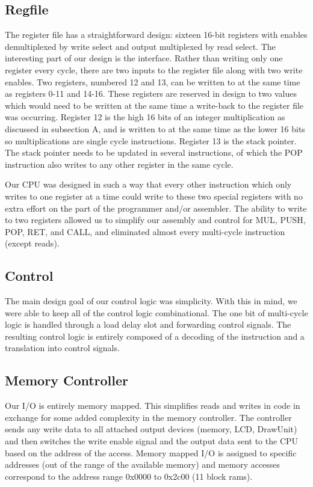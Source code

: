 \documentclass[onecolumn]{IEEEtran}
\begin{document}
\subsection{Regfile}
The register file has a straightforward design: sixteen 16-bit registers with enables demultiplexed by write select and output multiplexed by read select.  The interesting part of our design is the interface.  Rather than writing only one register every cycle, there are two inputs to the register file along with two write enables.  Two registers, numbered 12 and 13, can be written to at the same time as registers 0-11 and 14-16.  These registers are reserved in design to two values which would need to be written at the same time a write-back to the register file was occurring.  Register 12 is the high 16 bits of an integer multiplication as discussed in subsection A, and is written to at the same time as the lower 16 bits so multiplications are single cycle instructions.  Register 13 is the stack pointer.  The stack pointer needs to be updated in several instructions, of which the POP instruction also writes to any other register in the same cycle.

Our CPU was designed in such a way that every other instruction which only writes to one register at a time could write to these two special registers with no extra effort on the part of the programmer and/or assembler. The ability to write to two registers allowed us to simplify our assembly and control for MUL, PUSH, POP, RET, and CALL, and eliminated almost every multi-cycle instruction (except reads).

\subsection{Control}
The main design goal of our control logic was simplicity.  With this in mind, we were able to keep all of the control logic combinational.  The one bit of multi-cycle logic is handled through a load delay slot and forwarding control signals.  The resulting control logic is entirely composed of a decoding of the instruction and a translation into control signals.

\subsection{Memory Controller}
Our I/O is entirely memory mapped.  This simplifies reads and writes in code in exchange for some added complexity in the memory controller.  The controller sends any write data to all attached output devices (memory, LCD, DrawUnit) and then switches the write enable signal and the output data sent to the CPU based on the address of the access.  Memory mapped I/O is assigned to specific addresses (out of the range of the available memory) and memory accesses correspond to the address range 0x0000 to 0x2c00 (11 block rams).
\end{document}
